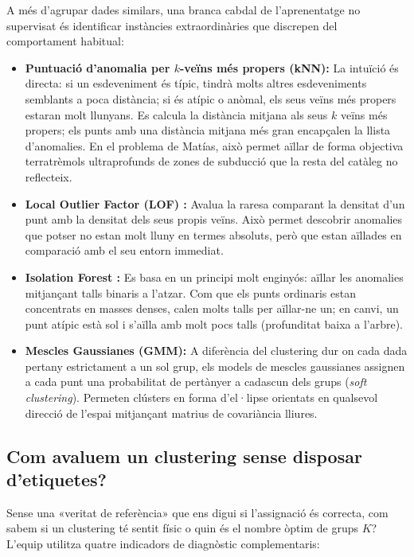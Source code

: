 \documentclass[a4paper,11pt]{article}
\begin{document}
A més d'agrupar dades similars, una branca cabdal de l'aprenentatge no supervisat és identificar instàncies extraordinàries que discrepen del comportament habitual:

\begin{itemize}
    \item \textbf{Puntuació d'anomalia per $k$-veïns més propers (kNN):} La intuïció és directa: si un esdeveniment és típic, tindrà molts altres esdeveniments semblants a poca distància; si és atípic o anòmal, els seus veïns més propers estaran molt llunyans. Es calcula la distància mitjana als seus $k$ veïns més propers; els punts amb una distància mitjana més gran encapçalen la llista d'anomalies. En el problema de Matías, això permet aïllar de forma objectiva terratrèmols ultraprofunds de zones de subducció que la resta del catàleg no reflecteix.
    \item \textbf{Local Outlier Factor (LOF) \cite{lof}:} Avalua la raresa comparant la densitat d'un punt amb la densitat dels seus propis veïns. Això permet descobrir anomalies que potser no estan molt lluny en termes absoluts, però que estan aïllades en comparació amb el seu entorn immediat.
    \item \textbf{Isolation Forest \cite{liu2008, iforest}:} Es basa en un principi molt enginyós: aïllar les anomalies mitjançant talls binaris a l'atzar. Com que els punts ordinaris estan concentrats en masses denses, calen molts talls per aïllar-ne un; en canvi, un punt atípic està sol i s'aïlla amb molt pocs talls (profunditat baixa a l'arbre).
    \item \textbf{Mescles Gaussianes (GMM):} A diferència del clustering dur on cada dada pertany estrictament a un sol grup, els models de mescles gaussianes assignen a cada punt una probabilitat de pertànyer a cadascun dels grups (\emph{soft clustering}). Permeten clústers en forma d'el·lipse orientats en qualsevol direcció de l'espai mitjançant matrius de covariància lliures.
\end{itemize}

\subsection{Com avaluem un clustering sense disposar d'etiquetes?}

Sense una «veritat de referència» que ens digui si l'assignació és correcta, com sabem si un clustering té sentit físic o quin és el nombre òptim de grups $K$? L'equip utilitza quatre indicadors de diagnòstic complementaris:
\end{document}
